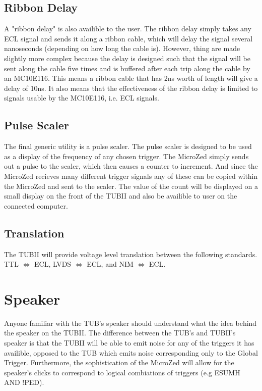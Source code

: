 \documentclass[11pt,a4paper]{article}
\begin{document}
\subsection{Ribbon Delay}
A "ribbon delay" is also availible to the user. The ribbon delay simply takes any ECL signal and sends it along a ribbon cable, which will delay the signal several nanoseconds (depending on how long the cable is). However, thing are made slightly more complex because the delay is designed such that the signal will be sent along the cable five times and is buffered after each trip along the cable by an MC10E116. This means a ribbon cable that has 2ns worth of length will give a delay of 10ns. It also means that the effectiveness of the ribbon delay is limited to signals usable by the MC10E116, i.e. ECL signals.

\subsection{Pulse Scaler}
The final generic utility is a pulse scaler. The pulse scaler is designed to be used as a display of the frequency of any chosen trigger. The MicroZed simply sends out a pulse to the scaler, which then causes a counter to increment. And since the MicroZed recieves many different trigger signals any of these can be copied within the MicroZed and sent to the scaler. The value of the count will be displayed on a small display on the front of the TUBII and also be availible to user on the connected computer.
\subsection{Translation}
The TUBII will provide voltage level translation between the following standards. TTL $\Longleftrightarrow$ ECL, LVDS $\Longleftrightarrow$ ECL, and NIM $\Longleftrightarrow$ ECL.
\section{Speaker}
Anyone familiar with the TUB's speaker should understand what the idea behind the  speaker on the TUBII. The difference between the TUB's and TUBII's speaker is that the TUBII will be able to emit noise for any of the triggers it has availible, opposed to the TUB which emits noise corresponding only to the Global Trigger. Furthermore, the sophistication of the MicroZed will allow for the speaker's clicks to correspond to logical combiations of triggers (e.g ESUMH AND !PED).
\end{document}
